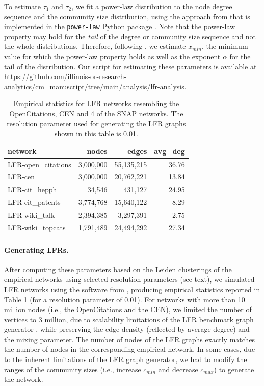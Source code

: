 \documentclass[11pt]{article}   	%
\begin{document}
To estimate $\tau_1$ and $\tau_2$, we fit a power-law distribution to the node degree sequence and the community size distribution, using the approach from \cite{clauset2009power} that is implemented in the \texttt{power-law} Python package \citep{alstott2014powerlaw}. Note that the power-law property may hold for the \textit{tail} of the degree or community size sequence and not the whole distributions. Therefore, following \cite{clauset2009power}, we estimate $x_{min}$, the minimum value for which the power-law property holds as well as the exponent $\alpha$ for the tail of the distribution. Our script for estimating these parameters is available at \href{https://github.com/illinois-or-research-analytics/cm_manuscript/tree/main/analysis/lfr-analysis}{https://github.com/illinois-or-research-analytics/cm\_manuscript/tree/main/analysis/lfr-analysis}.


\begin{table}[ht]
\caption{Empirical statistics for LFR networks resembling the OpenCitations, CEN and 4 of the SNAP networks. The resolution parameter used for generating the LFR graphs shown in this table is 0.01.}
\centering
\begin{tabular}{lrrr}
  \hline
 network & nodes & edges & avg\_deg \\
  \hline
    LFR-open\_citations & 3,000,000  & 55,135,215 & 36.76 \\
    LFR-cen & 3,000,000 & 20,762,221 & 13.84 \\
    LFR-cit\_hepph &  34,546 & 431,127 & 24.95 \\
    LFR-cit\_patents & 3,774,768 & 15,640,122 & 8.29 \\
    LFR-wiki\_talk & 2,394,385 & 3,297,391 & 2.75 \\
    LFR-wiki\_topcats & 1,791,489 & 24,494,292 & 27.34 \\
 \hline
\end{tabular}
\label{tab:empirical-stats-LFR}
\end{table}

\paragraph{Generating LFRs.}
After computing these parameters based on the Leiden clusterings of the empirical networks using selected resolution parameters (see text), we simulated LFR networks using the software from \cite{lancichinetti2008benchmark}, producing empirical statistics reported in Table \ref{tab:empirical-stats-LFR} (for a resolution parameter of 0.01). For networks with more than 10 million nodes (i.e., the OpenCitations and the CEN), we limited the number of vertices to 3 million, due to scalability limitations of  the LFR benchmark graph generator \citep{slota2019scalable}, while preserving the edge density (reflected by average degree) and the mixing parameter.  The number of nodes of the LFR graphs exactly matches the number of nodes in the corresponding empirical network. In some cases, due to the inherent limitations of the LFR graph generator, we had to modify the ranges of the community sizes (i.e., increase $c_{min}$ and decrease $c_{max}$) to generate the network.
\end{document}
